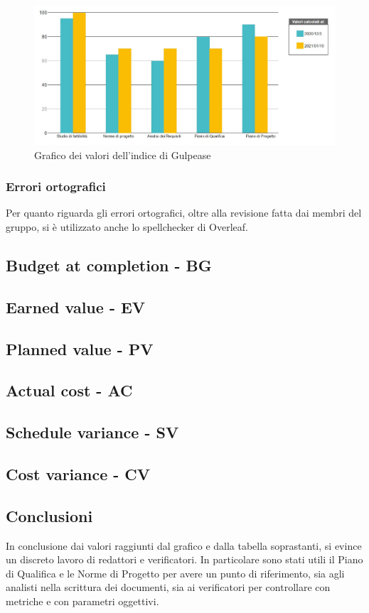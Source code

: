 \newpage
\begin{figure}[H]
    \centering
    \includegraphics[width=15 cm]{source/sections/images/gulpeaseGrafico.JPG}
    \caption{Grafico dei valori dell'indice di Gulpease}
\end{figure}


\subsubsection{Errori ortografici}

Per quanto riguarda gli errori ortografici, oltre alla revisione fatta dai membri del gruppo, si è utilizzato anche lo spellchecker di Overleaf.

\subsection{Budget at completion - BG}
\subsection{Earned value - EV}
\subsection{Planned value - PV}
\subsection{Actual cost - AC}
\subsection{Schedule variance - SV}
\subsection{Cost variance - CV}

\subsection{Conclusioni}

In conclusione dai valori raggiunti dal grafico e dalla tabella soprastanti, si evince un discreto lavoro di redattori e verificatori. In particolare sono stati utili il Piano di Qualifica e le Norme di Progetto per avere un punto di riferimento, sia agli analisti nella scrittura dei documenti, sia ai verificatori per controllare con metriche e con parametri oggettivi.


